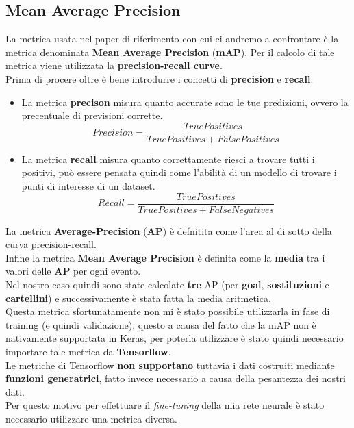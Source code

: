 \subsection{Mean Average Precision}
La metrica usata nel paper di riferimento con cui ci andremo a confrontare è la metrica denominata \textbf{Mean Average Precision} (\textbf{mAP}). Per il calcolo di tale metrica viene utilizzata la \textbf{precision-recall curve}.
\\Prima di procere oltre è bene introdurre i concetti di \textbf{precision} e \textbf{recall}:
\begin{itemize}
\item La metrica \textbf{precison} misura quanto accurate sono le tue predizioni, ovvero la precentuale di previsioni corrette.
\begin{equation}
Precision=\frac{True Positives}{True Positives + False Positives}
\label{Precision}
\end{equation}
\item La metrica \textbf{recall} misura quanto correttamente riesci a trovare tutti i positivi, può essere pensata quindi come l'abilità di un modello di trovare i punti di interesse di un dataset.
\begin{equation}
Recall=\frac{True Positives}{True Positives + False Negatives}
\label{Recall}
\end{equation}
\end{itemize}
La metrica \textbf{Average-Precision} (\textbf{AP}) è defnitita come l'area al di sotto della curva precision-recall.
\\Infine la metrica \textbf{Mean Average Precision} è definita come la \textbf{media} tra i valori delle \textbf{AP} per ogni evento. 
\\Nel nostro caso quindi sono state calcolate \textbf{tre} AP (per \textbf{goal}, \textbf{sostituzioni} e \textbf{cartellini}) e successivamente è stata fatta la media aritmetica.
\\Questa metrica sfortunatamente non mi è stato possibile utilizzarla in fase di training (e quindi validazione), questo a causa del fatto che la mAP non è nativamente supportata in Keras, per poterla utilizzare è stato quindi necessario importare tale metrica da \textbf{Tensorflow}.
\\Le metriche di Tensorflow \textbf{non supportano} tuttavia i dati costruiti mediante \textbf{funzioni generatrici}, fatto invece necessario a causa della pesantezza dei nostri dati.
\\Per questo motivo per effettuare il \textit{fine-tuning} della mia rete neurale è stato necessario utilizzare una metrica diversa.
